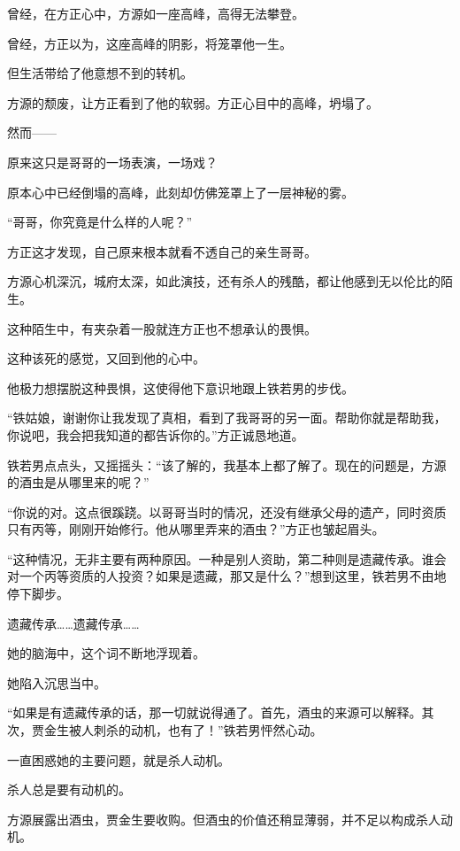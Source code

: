 
\begin{this_body}



曾经，在方正心中，方源如一座高峰，高得无法攀登。

曾经，方正以为，这座高峰的阴影，将笼罩他一生。

但生活带给了他意想不到的转机。

方源的颓废，让方正看到了他的软弱。方正心目中的高峰，坍塌了。

然而——

原来这只是哥哥的一场表演，一场戏？

原本心中已经倒塌的高峰，此刻却仿佛笼罩上了一层神秘的雾。

“哥哥，你究竟是什么样的人呢？”

方正这才发现，自己原来根本就看不透自己的亲生哥哥。

方源心机深沉，城府太深，如此演技，还有杀人的残酷，都让他感到无以伦比的陌生。

这种陌生中，有夹杂着一股就连方正也不想承认的畏惧。

这种该死的感觉，又回到他的心中。

他极力想摆脱这种畏惧，这使得他下意识地跟上铁若男的步伐。

“铁姑娘，谢谢你让我发现了真相，看到了我哥哥的另一面。帮助你就是帮助我，你说吧，我会把我知道的都告诉你的。”方正诚恳地道。

铁若男点点头，又摇摇头：“该了解的，我基本上都了解了。现在的问题是，方源的酒虫是从哪里来的呢？”

“你说的对。这点很蹊跷。以哥哥当时的情况，还没有继承父母的遗产，同时资质只有丙等，刚刚开始修行。他从哪里弄来的酒虫？”方正也皱起眉头。

“这种情况，无非主要有两种原因。一种是别人资助，第二种则是遗藏传承。谁会对一个丙等资质的人投资？如果是遗藏，那又是什么？”想到这里，铁若男不由地停下脚步。

遗藏传承……遗藏传承……

她的脑海中，这个词不断地浮现着。

她陷入沉思当中。

“如果是有遗藏传承的话，那一切就说得通了。首先，酒虫的来源可以解释。其次，贾金生被人刺杀的动机，也有了！”铁若男怦然心动。

一直困惑她的主要问题，就是杀人动机。

杀人总是要有动机的。

方源展露出酒虫，贾金生要收购。但酒虫的价值还稍显薄弱，并不足以构成杀人动机。


\end{this_body}
